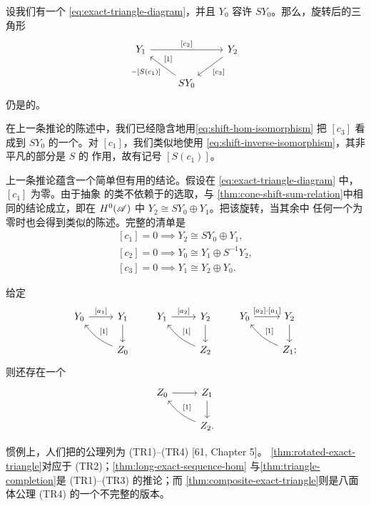 \begin{corollary}\label{thm:rotated-exact-triangle}
设我们有一个\trExactTriangle{} \eqref{eq:exact-triangle-diagram}，并且 $Y_0$
容许\trSuspension{} $SY_0$。那么，旋转后的三角形
\begin{equation*}
\begin{tikzcd}
Y_1 \ar[rr,"{[c_2]}"] && Y_2 \ar[dl,"{[c_3]}"] \\
& SY_0 \ar[ul,"{-[S(c_1)]}","{[1]}"{swap,pos=0.55}] &
\end{tikzcd}
\end{equation*}
仍是\trExact{}的。
\end{corollary}

在上一条推论的陈述中，我们已经隐含地用\eqref{eq:shift-hom-isomorphism} 把
$[c_3]$ 看成到 $SY_0$ 的一个\trMorphism。对 $[c_1]$，我们类似地使用
\eqref{eq:shift-inverse-isomorphism}，其非平凡的部分是\trShiftFunctor{} $S$ 的
作用，故有记号 $[S(c_1)]$。

\begin{remark}\label{thm:vanishing-maps-splitting}
上一条推论蕴含一个简单但有用的结论。假设在\trExactTriangle{}
\eqref{eq:exact-triangle-diagram} 中，\trMorphism{} $[c_1]$ 为零。由于抽象%
\trMappingCone{}的\trIsomorphism{}类不依赖于\trCocycle{}的选取，与%
\cref{thm:cone-shift-sum-relation}中相同的结论成立，即在 $H^0(\mathscr{A})$ 中
$Y_2\cong SY_0\oplus Y_1$。把该\trExactTriangle{}旋转，当其余\trMorphism{}中
任何一个为零时也会得到类似的陈述。完整的清单是
\begin{equation*}
\begin{gathered}
[c_1]=0 \implies Y_2\cong SY_0\oplus Y_1,\\
[c_2]=0 \implies Y_0\cong Y_1\oplus S^{-1}Y_2,\\
[c_3]=0 \implies Y_1\cong Y_2\oplus Y_0.
\end{gathered}
\end{equation*}
\end{remark}

\begin{corollary}\label{thm:composite-exact-triangle}
给定\trExactTriangle
\begin{equation*}
\begin{tikzcd}
Y_0 \ar[r,"{[a_1]}"] & Y_1 \ar[d] \\
& Z_0 \ar[ul,bend left=15,"{[1]}"']
\end{tikzcd}
\qquad
\begin{tikzcd}
Y_1 \ar[r,"{[a_2]}"] & Y_2 \ar[d] \\
& Z_2 \ar[ul,bend left=15,"{[1]}"']
\end{tikzcd}
\qquad
\begin{tikzcd}
Y_0 \ar[r,"{[a_2]\cdot[a_1]}"] & Y_2 \ar[d] \\
& Z_1; \ar[ul,bend left=15,"{[1]}"']
\end{tikzcd}
\end{equation*}
则还存在一个\trExactTriangle
\begin{equation*}
\begin{tikzcd}
Z_0 \ar[r] & Z_1 \ar[d] \\
& Z_2. \ar[ul,bend left=15,"{[1]}"']
\end{tikzcd}
\end{equation*}
\end{corollary}

惯例上，人们把\trTriangulated\trCategory{}的公理列为 (TR1)--(TR4) [61, Chapter 5]。
\cref{thm:rotated-exact-triangle}对应于 (TR2)；\cref{thm:long-exact-sequence-hom}
与\cref{thm:triangle-completion}是 (TR1)--(TR3) 的推论；而
\cref{thm:composite-exact-triangle}则是八面体公理 (TR4) 的一个不完整的版本。
